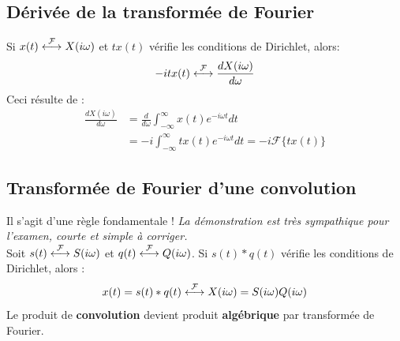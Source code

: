 \subsection{Dérivée de la transformée de Fourier}
Si $x(t) \ft X(i\omega)$ et $tx(t)$ vérifie les conditions de Dirichlet,
alors:
\begin{equation}
	-itx(t) \ft \frac{dX(i\omega)}{d\omega}
\end{equation}
Ceci résulte de :
\begin{equation}
	\begin{array}{ll}
		\frac{dX(i\omega)}{d\omega} & = \frac{d}{d\omega}\int_{-\infty}^\infty                                  
		x(t)e^{-i\omega t}dt\\
		                            & = -i \int_{-\infty}^\infty tx(t)e^{-i\omega t}dt = -i\mathcal{F}\{tx(t)\} 
	\end{array}
\end{equation}



\subsection{Transformée de Fourier d'une convolution}
Il s'agit d'une règle fondamentale ! \textit{La démonstration est très sympathique
	pour l'examen, courte et simple à corriger.}\\
Soit $s(t) \ft S(i\omega)$ et $q(t) \ft Q(i\omega)$. Si $s(t)*q(t)$ vérifie les 
conditions de Dirichlet, alors :
\begin{equation}
	x(t) = s(t)*q(t) \ft X(i\omega) = S(i\omega)Q(i\omega)
	\label{eq:TransfoConvol}
\end{equation}
Le produit de \textbf{convolution} devient produit \textbf{algébrique} par transformée 
de Fourier.
	
